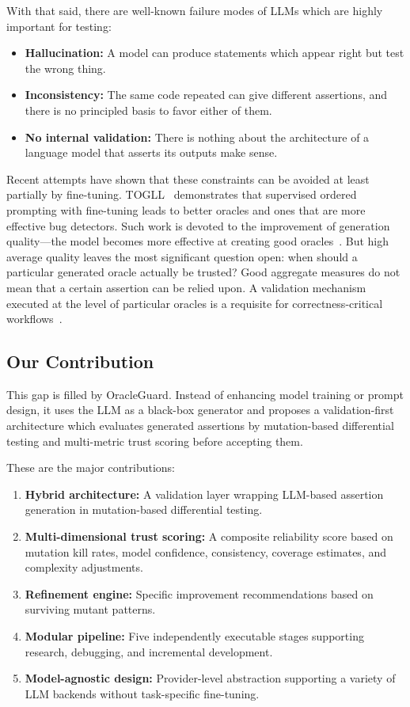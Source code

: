 \documentclass[conference]{IEEEtran}
\begin{document}
With that said, there are well-known failure modes of LLMs which are highly important for testing:

\begin{itemize}
\item \textbf{Hallucination:} A model can produce statements which appear right but test the wrong thing.
\item \textbf{Inconsistency:} The same code repeated can give different assertions, and there is no principled basis to favor either of them.
\item \textbf{No internal validation:} There is nothing about the architecture of a language model that asserts its outputs make sense.
\end{itemize}

Recent attempts have shown that these constraints can be avoided at least partially by fine-tuning. TOGLL~\cite{hossain2024togll} demonstrates that supervised ordered prompting with fine-tuning leads to better oracles and ones that are more effective bug detectors. Such work is devoted to the improvement of generation quality---the model becomes more effective at creating good oracles~\cite{hossain2024togll,hossain2025doc2oracll}. But high average quality leaves the most significant question open: when should a particular generated oracle actually be trusted? Good aggregate measures do not mean that a certain assertion can be relied upon. A validation mechanism executed at the level of particular oracles is a requisite for correctness-critical workflows~\cite{xiong2023express_confidence,liu2024uncertainty_estimation}.

\subsection{Our Contribution}

This gap is filled by OracleGuard. Instead of enhancing model training or prompt design, it uses the LLM as a black-box generator and proposes a validation-first architecture which evaluates generated assertions by mutation-based differential testing and multi-metric trust scoring before accepting them.

These are the major contributions:

\begin{enumerate}
\item \textbf{Hybrid architecture:} A validation layer wrapping LLM-based assertion generation in mutation-based differential testing.
\item \textbf{Multi-dimensional trust scoring:} A composite reliability score based on mutation kill rates, model confidence, consistency, coverage estimates, and complexity adjustments.
\item \textbf{Refinement engine:} Specific improvement recommendations based on surviving mutant patterns.
\item \textbf{Modular pipeline:} Five independently executable stages supporting research, debugging, and incremental development.
\item \textbf{Model-agnostic design:} Provider-level abstraction supporting a variety of LLM backends without task-specific fine-tuning.
\end{enumerate}
\end{document}
